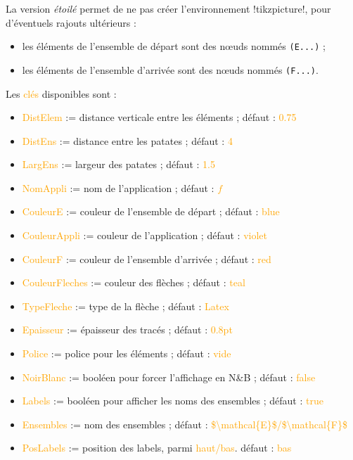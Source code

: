 \documentclass[french,a4paper,11pt]{article}
\newcommand\Cle[1]{{\small\sffamily\textlangle \textcolor{orange}{#1}\textrangle}}
\begin{document}
{\begin{tipblock}
La version \textit{étoilé} permet de ne pas créer l'environnement \motcletex!tikzpicture!, pour d'éventuels rajouts ultérieurs :

\begin{itemize}
	\item les éléments de l'ensemble de départ sont des nœuds nommés \verb!(E...)! ;
	\item les éléments de l'ensemble d'arrivée sont des nœuds nommés \verb!(F...)!.
\end{itemize}
\vspace*{-\baselineskip}\leavevmode
\end{tipblock}


\begin{tipblock}
Les \Cle{clés} disponibles sont :

\begin{itemize}
	\item \Cle{DistElem} := distance verticale entre les éléments ; \hfill{}défaut : \Cle{0.75}
	\item \Cle{DistEns} := distance entre les \og patates \fg{} ; \hfill{}défaut : \Cle{4}
	\item \Cle{LargEns} := largeur des \og patates \fg{} ; \hfill{}défaut : \Cle{1.5}
	\item \Cle{NomAppli} := nom de l'application ; \hfill{}défaut : \Cle{$f$}
	\item \Cle{CouleurE} := couleur de l'ensemble de départ ; \hfill{}défaut : \Cle{blue}
	\item \Cle{CouleurAppli} := couleur de l'application ; \hfill{}défaut : \Cle{violet}
	\item \Cle{CouleurF} := couleur de l'ensemble d'arrivée ; \hfill{}défaut : \Cle{red}
	\item \Cle{CouleurFleches} := couleur des flèches ; \hfill{}défaut : \Cle{teal}
	\item \Cle{TypeFleche} := type de la flèche  ; \hfill{}défaut : \Cle{Latex}
	\item \Cle{Epaisseur} := épaisseur des tracés ; \hfill{}défaut : \Cle{0.8pt}
	\item \Cle{Police} := police pour les éléments ; \hfill{}défaut : \Cle{vide}
	\item \Cle{NoirBlanc} := booléen pour forcer l'affichage en N\&{}B ; \hfill{}défaut : \Cle{false}
	\item \Cle{Labels} := booléen pour afficher les noms des ensembles ; \hfill{}défaut : \Cle{true}
	\item \Cle{Ensembles} := nom des ensembles  ; \hfill{}défaut : \Cle{\$\textbackslash mathcal\{E\}\$/\$\textbackslash  mathcal\{F\}\$}
	\item \Cle{PosLabels} := position des labels, parmi \Cle{haut/bas}. \hfill{}défaut : \Cle{bas}
\end{itemize}


\end{tipblock}}
\end{document}

